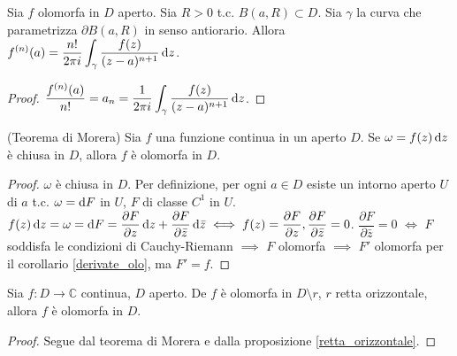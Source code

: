 \begin{cor}
  Sia $f$ olomorfa in $D$ aperto. Sia $R>0$ t.c. $B(a, R) \subset D$. Sia $\gamma$ la curva che parametrizza $\partial B(a, R)$ in senso antiorario. Allora $\displaystyle f^{(n)}(a)=\frac{n!}{2\pi i}\int_{\gamma}\frac{f(z)}{(z-a)^{n+1}}\mathop{}\!\mathrm{d} z$.
\end{cor}

\begin{proof}
  $\displaystyle \frac{f^{(n)}(a)}{n!}=a_n=\frac{1}{2\pi i}\int_{\gamma}\frac{f(z)}{(z-a)^{n+1}}\mathop{}\!\mathrm{d} z$.
\end{proof}

\begin{thm}
  (Teorema di Morera) Sia $f$ una funzione continua in un aperto $D$. Se $\omega=f(z)\mathop{}\!\mathrm{d} z$ è chiusa in $D$, allora $f$ è olomorfa in $D$.
\end{thm}

\begin{proof}
  $\omega$ è chiusa in $D$. Per definizione, per ogni $a \in D$ esiste un intorno aperto $U$ di $a$ t.c. $\omega=\mathop{}\!\mathrm{d} F$ in $U$, $F$ di classe $C^1$ in $U$.
  $f(z)\mathop{}\!\mathrm{d} z=\omega=\mathop{}\!\mathrm{d} F=\dfrac{\partial F}{\partial z}\mathop{}\!\mathrm{d} z+\dfrac{\partial F}{\partial\bar{z}}\mathop{}\!\mathrm{d}\bar{z} \iff f(z)=\dfrac{\partial F}{\partial z}, \dfrac{\partial F}{\partial\bar{z}}=0$.
  $\dfrac{\partial F}{\partial\bar{z}}=0$ $\iff$ $F$ soddisfa le condizioni di Cauchy-Riemann $\implies$ $F$ olomorfa $\implies$ $F'$ olomorfa per il corollario \ref{derivate_olo}, ma $F'=f$.
\end{proof}

\begin{cor}
  Sia $f:D \longrightarrow \mathbb{C}$ continua, $D$ aperto. De $f$ è olomorfa in $D \setminus r$, $r$ retta orizzontale, allora $f$ è olomorfa in $D$.
\end{cor}

\begin{proof}
  Segue dal teorema di Morera e dalla proposizione \ref{retta_orizzontale}.
\end{proof}
